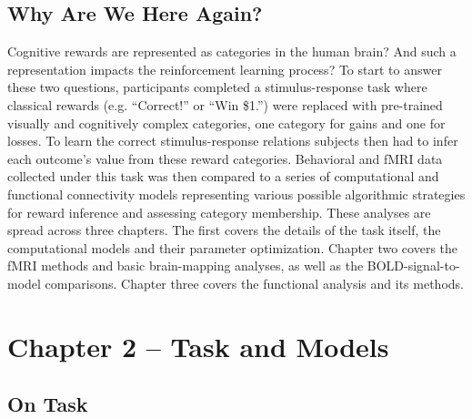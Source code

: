 \documentclass[doc,12pt]{apa}        %
\begin{document}
\subsection{Why Are We Here Again?}
\label{sub:goals}
Cognitive rewards are represented as categories in the human brain?  And such a representation impacts the reinforcement learning process?  To start to answer these two questions, participants completed a stimulus-response task where classical rewards (e.g. ``Correct!'' or ``Win \$1.'') were replaced with pre-trained visually and cognitively complex categories, one category for gains and one for losses.  To learn the correct stimulus-response relations subjects then had to infer each outcome's value from these reward categories.   Behavioral and fMRI data collected under this task was then compared to a series of computational and functional connectivity models representing various possible algorithmic strategies for reward inference and assessing category membership.  These analyses are spread across three chapters.  The first covers the details of the task itself, the computational models and their parameter optimization.  Chapter two covers the fMRI methods and basic brain-mapping analyses, as well as the BOLD-signal-to-model comparisons.  Chapter three covers the functional analysis and its methods.


\section{Chapter 2 -- Task and Models} %
\label{sec:task_and_models}
\subsection{On Task}
\label{sub:to_task}
\end{document}
